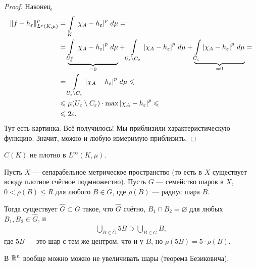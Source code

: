 \begin{proof}
Наконец,
\begin{align*}
 \left\| f - h_{\varepsilon} \right\|_{L^{p}(K,\mu)}^{p} &= \int\limits_{K} \left| \chi_A - h_\varepsilon \right|^{p} \, d\mu  = \\ &= \underbrace{\int\limits_{U_{\varepsilon}^{c}} \left| \chi_A - h_{\varepsilon} \right|^{p} \, d\mu}_{=0}   + \int\limits_{U_{\varepsilon} \setminus C_{\varepsilon}} \left| \chi_A - h_{\varepsilon} \right|^{p} \, d\mu  + \underbrace{\int\limits_{C_{\varepsilon}} \left| \chi_A - h_{\varepsilon} \right|^{p} \, d\mu}_{= 0}  = \\
 &= \int\limits_{U_{\varepsilon} \setminus C_{\varepsilon}} \left| \chi_A - h_{\varepsilon} \right|^{p} \, d\mu  \leqslant \\
  & \leqslant \mu(U_{\varepsilon} \setminus C_{\varepsilon}) \cdot \max \left| \chi_A - h_{\varepsilon} \right|^{p} \leqslant \\
  &\leqslant 2\varepsilon
.\end{align*} {\color{red} Тут есть картинка}. Всё получилось! Мы приблизили характеристическую функцию. Значит, можно и любую измеримую приблизить.
\end{proof}
\begin{remrk*}
 $C(K)$ не плотно в $L^{\infty}(K, \mu)$.
\end{remrk*}
\begin{lm}[%
Витали]
\label{lemma:vitali}
Пусть $X$ --- сепарабельное метрическое пространство (то есть в $X$ существует всюду плотное счётное подмножество). Пусть $G$ --- семейство шаров в $X$, $0 < \rho(B) \leqslant R$ для любого $B \in G$, где $\rho(B)$ --- радиус шара $B$.

Тогда существует $\hat G \subset G$ такое, что $\hat G$ счётно, $B_1 \cap B_2 = \varnothing$ для любых $B_1, B_2 \in \hat G$, и \begin{align*}
 \bigcup_{B \in \hat G}  5B \supset \bigcup_{B \in G} B
,\end{align*} где $5B$ --- это шар с тем же центром, что и у  $B$, но $\rho(5B) = 5 \cdot \rho(B)$.
\end{lm}
В $\mathbb{R}^{n}$ вообще можно можно не увеличивать шары (теорема Безиковича).
